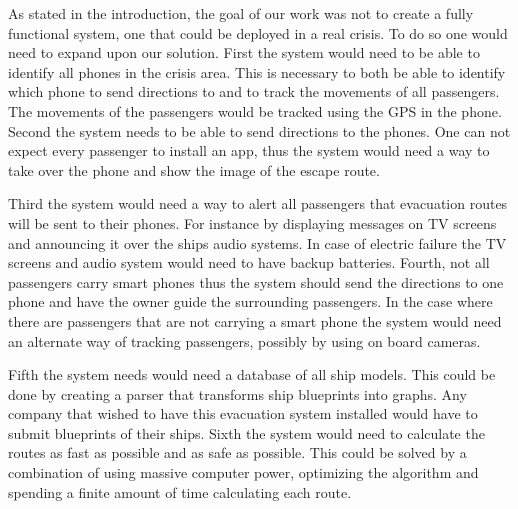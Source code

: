 As stated in the introduction, the goal of our work was not to create a fully functional system, one that could be deployed in a real crisis. To do so one would need to expand upon our solution. First the system would need to be able to identify all phones in the crisis area. This is necessary to both be able to identify which phone to send directions to and to track the movements of all passengers. The movements of the passengers would be tracked using the GPS in the phone. Second the system needs to be able to send directions to the phones. One can not expect every passenger to install an app, thus the system would need a way to take over the phone and show the image of the escape route. 

Third the system would need a way to alert all passengers that evacuation routes will be sent to their phones. For instance by displaying messages on TV screens and announcing it over the ships audio systems. In case of electric failure the TV screens and audio system would need to have backup batteries.  Fourth, not all passengers carry smart phones thus the system should send the directions to one phone and have the owner guide the surrounding passengers. In the case where there are passengers that are not carrying a smart phone the system would need an alternate way of tracking passengers, possibly by using on board cameras.

Fifth the system needs would need a database of all ship models. This could be done by creating a parser that transforms ship blueprints into graphs. Any company that wished to have this evacuation system installed would have to submit blueprints of their ships. Sixth the system would need to calculate the routes as fast as possible and as safe as possible. This could be solved by a combination of using massive computer power, optimizing the algorithm and spending a finite amount of time calculating each route.

